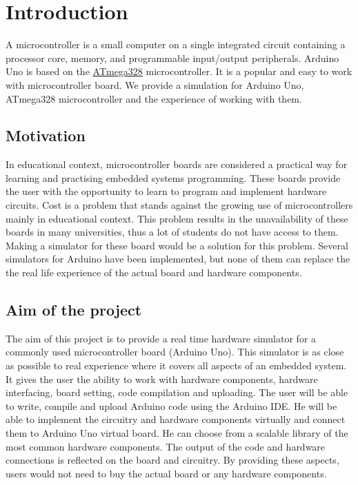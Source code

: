 \chapter{Introduction}
\label{chap:intro}

A microcontroller is a small computer on a single integrated circuit containing a processor core, memory, and programmable input/output peripherals\cite{Wikidef:URL}. Arduino Uno is based on the \href{http://www.atmel.com/devices/atmega328.aspx?tab=overview}{ATmega328} microcontroller. It is a popular and easy to work with microcontroller board. We provide a simulation for Arduino Uno, ATmega328 microcontroller and the experience of working with them.

\section*{Motivation} \label{sec:s1}
In educational context, microcontroller boards are considered a practical way for learning and practising embedded systems programming. These boards provide the user with the opportunity to learn to program and implement hardware circuits. Cost is a problem that stands against the growing use of microcontrollers mainly in educational context. This problem results in the unavailability of these boards in many universities, thus a lot of students do not have access to them. Making a simulator for these board would be a solution for this problem. Several simulators for Arduino have been implemented, but none of them can replace the the real life experience of the actual board and hardware components.

\section*{Aim of the project}
The aim of this project is to provide a real time hardware simulator for a commonly used microcontroller board (Arduino Uno). This simulator is as close as possible to real experience where it covers all aspects of an embedded system. It gives the user the ability to work with hardware components, hardware interfacing, board setting, code compilation and uploading. The user will be able to write, compile and upload Arduino code using the Arduino IDE. He will be able to implement the circuitry and hardware components virtually and connect them to Arduino Uno virtual board. He can choose from a scalable library of the most common hardware components. The output of the code and hardware connections is reflected on the board and circuitry. By providing these aspects, users would not need to buy the actual board or any hardware components.
